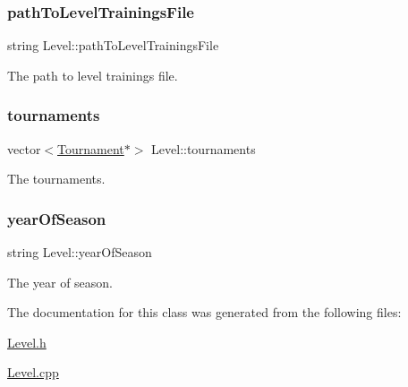 \subsubsection{\texorpdfstring{path\+To\+Level\+Trainings\+File}{pathToLevelTrainingsFile}}
{\footnotesize\ttfamily string Level\+::path\+To\+Level\+Trainings\+File\hspace{0.3cm}{\ttfamily [private]}}



The path to level trainings file. 

\hypertarget{class_level_ad6c327fa0c1fc11c38bc167de8e92476}{}\label{class_level_ad6c327fa0c1fc11c38bc167de8e92476} 
\subsubsection{\texorpdfstring{tournaments}{tournaments}}
{\footnotesize\ttfamily vector$<$\hyperlink{class_tournament}{Tournament}$\ast$$>$ Level\+::tournaments\hspace{0.3cm}{\ttfamily [private]}}



The tournaments. 

\hypertarget{class_level_a39e8e8b8d5f64c3d3a50b617c3ea8321}{}\label{class_level_a39e8e8b8d5f64c3d3a50b617c3ea8321} 
\subsubsection{\texorpdfstring{year\+Of\+Season}{yearOfSeason}}
{\footnotesize\ttfamily string Level\+::year\+Of\+Season\hspace{0.3cm}{\ttfamily [private]}}



The year of season. 



The documentation for this class was generated from the following files\+:\begin{DoxyCompactItemize}
\item 
\hyperlink{_level_8h}{Level.\+h}\item 
\hyperlink{_level_8cpp}{Level.\+cpp}\end{DoxyCompactItemize}
